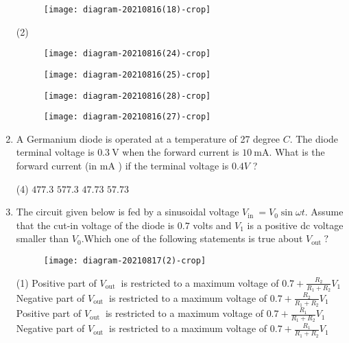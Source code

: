 \begin{enumerate}
\begin{figure}[H]
	\centering
	\texttt{[image: diagram-20210816(18)-crop]}
\end{figure}
\begin{tasks}(2)
	\task[\textbf{A.}] \begin{figure}[H]
		\centering
		\texttt{[image: diagram-20210816(24)-crop]}
	\end{figure}
	\task[\textbf{B.}] \begin{figure}[H]
		\centering
		\texttt{[image: diagram-20210816(25)-crop]}
	\end{figure}
	\task[\textbf{C.}] \begin{figure}[H]
		\centering
		\texttt{[image: diagram-20210816(28)-crop]}
	\end{figure}
	\task[\textbf{D.}] \begin{figure}[H]
		\centering
		\texttt{[image: diagram-20210816(27)-crop]}
	\end{figure}
\end{tasks}
	\item A Germanium diode is operated at a temperature of 27 degree $C$. The diode terminal voltage is $0.3 \mathrm{~V}$ when the forward current is $10 \mathrm{~mA}$. What is the forward current (in $\mathrm{mA}$ ) if the terminal voltage is $0.4 V$ ?
{}

\begin{tasks}(4)
	\task[\textbf{A.}] $477.3$
	\task[\textbf{B.}] $577.3$
	\task[\textbf{C.}] $47.73$
	\task[\textbf{D.}] $57.73$
\end{tasks}
\item The circuit given below is fed by a sinusoidal voltage $V_{\text {in }}=V_{0} \sin \omega t .$ Assume that the
cut-in voltage of the diode is $0.7$ volts and $V_{1}$ is a positive dc voltage smaller than $V_{0}$.Which one of the following statements is true about $V_{\text {out }} ?$
{}

\begin{figure}[H]
	\centering
	\texttt{[image: diagram-20210817(2)-crop]}
\end{figure}
\begin{tasks}(1)
	\task[\textbf{A.}] Positive part of $V_{\text {out }}$ is restricted to a maximum voltage of $0.7+\frac{R_{2}}{R_{1}+R_{2}} V_{1}$
	\task[\textbf{B.}] Negative part of $V_{\text {out }}$ is restricted to a maximum voltage of $0.7+\frac{R_{2}}{R_{1}+R_{2}} V_{1}$
	\task[\textbf{C.}] Positive part of $V_{\text {out }}$ is restricted to a maximum voltage of $0.7+\frac{R_{1}}{R_{1}+R_{2}} V_{1}$
	\task[\textbf{D.}] Negative part of $V_{\text {out }}$ is restricted to a maximum voltage of $0.7+\frac{R_{1}}{R_{1}+R_{2}} V_{1}$
\end{tasks}
\end{enumerate}
